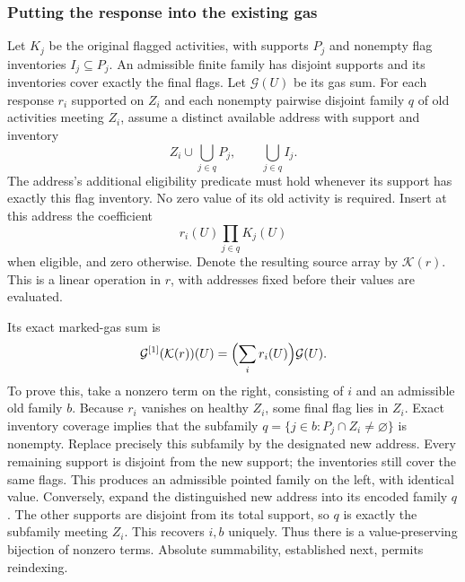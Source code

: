 \subsubsection{Putting the response into the existing gas}
Let $K_j$ be the original flagged activities, with supports $P_j$
and nonempty flag inventories $I_j\subseteq P_j$. An admissible
finite family has disjoint supports and its inventories cover
exactly the final flags. Let $\mathcal G(U)$ be its gas sum.
For each response $r_i$ supported on $Z_i$ and each nonempty
pairwise disjoint family $q$ of old activities meeting $Z_i$, assume
a distinct available address with support and inventory
\[
       Z_i\cup\bigcup_{j\in q}P_j,\qquad \bigcup_{j\in q}I_j.
\]
The address's additional eligibility predicate must hold whenever
its support has exactly this flag inventory. No zero value of its
old activity is required. Insert at this address the coefficient
\[
       r_i(U)\prod_{j\in q}K_j(U)
\]
when eligible, and zero otherwise. Denote the resulting source
array by $\mathcal K(r)$. This is a linear operation in $r$, with
addresses fixed before their values are evaluated.

Its exact marked-gas sum is
\begin{equation}\label{eq:local-gas-recovery}
       \mathcal G^{[1]}(\mathcal K(r))(U)
                     =\Bigl(\sum_i r_i(U)\Bigr)\mathcal G(U).
\end{equation}
To prove this, take a nonzero term on the right, consisting of
$i$ and an admissible old family $b$. Because $r_i$ vanishes on
healthy $Z_i$, some final flag lies in $Z_i$. Exact inventory
coverage implies that the subfamily
$q=\{j\in b:P_j\cap Z_i\ne\varnothing\}$ is nonempty.
Replace precisely this subfamily by the designated new address.
Every remaining support is disjoint from the new support;
the inventories still cover the same flags. This produces an
admissible pointed family on the left, with identical value.
Conversely, expand the distinguished new address into its encoded
family $q$. The other supports are disjoint from its total support,
so $q$ is exactly the subfamily meeting $Z_i$. This recovers $i,b$
uniquely. Thus there is a value-preserving bijection of nonzero
terms. Absolute summability, established next, permits reindexing.

